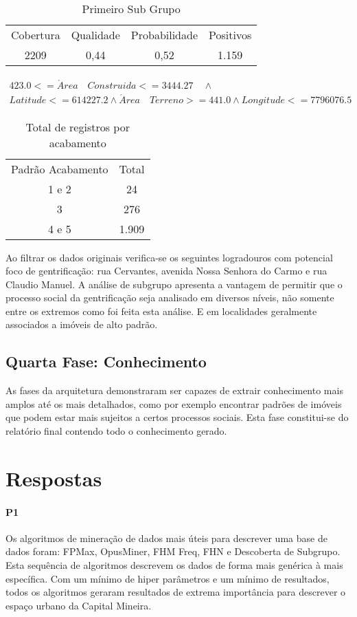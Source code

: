 \documentclass[12pt]{article}
\begin{document}
\begin{table}[ht]
\centering
\label{table:sub}
\begin{tabular}{cccc}
 Cobertura & Qualidade & Probabilidade & Positivos  \\
 2209 & 0,44 & 0,52  &  1.159  \\
\end{tabular}
\caption{Primeiro Sub Grupo}
\end{table}

\begin{gather*}
423.0 <= \acute{A}rea \quad Construida <= 3444.27  \quad \land \\ Latitude <= 614227.2 \land \acute{A}rea \quad Terreno >= 441.0  \land Longitude <= 7796076.5
\end{gather*}
\begin{table}[!htbp]
\centering
\label{table:sub-aca}
\begin{tabular}{cc}
 Padrão Acabamento & Total  \\
 1 e 2 & 24 \\
 3 & 276 \\
 4 e 5 & 1.909 \\
\end{tabular}
\caption{Total de registros por acabamento}
\end{table}

Ao filtrar os dados originais verifica-se os seguintes logradouros com potencial foco de gentrificação: rua Cervantes, avenida Nossa Senhora do Carmo e rua Claudio Manuel. A análise de subgrupo apresenta a vantagem de permitir que o processo social da gentrificação seja analisado em diversos níveis, não somente entre os extremos como foi feita esta análise. E em localidades geralmente associados a imóveis de alto padrão.

\subsection{Quarta Fase: Conhecimento}
As fases da arquitetura demonstraram ser capazes de extrair conhecimento mais amplos até os mais detalhados, como por exemplo encontrar padrões de imóveis que podem estar mais sujeitos a certos processos sociais. Esta fase constitui-se do relatório final contendo todo o conhecimento gerado.

\section{Respostas}
\paragraph{P1} Os algoritmos de mineração de dados mais úteis para descrever uma base de dados foram: FPMax, OpusMiner, FHM Freq, FHN e Descoberta de Subgrupo. Esta sequência de algoritmos descrevem os dados de forma mais genérica à mais específica. Com um mínimo de hiper parâmetros e um mínimo de resultados, todos os algoritmos geraram resultados de extrema importância para descrever o espaço urbano da Capital Mineira.
\end{document}

